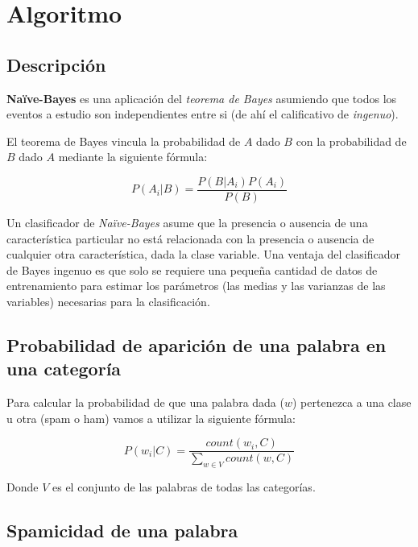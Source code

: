\section{Algoritmo}

\subsection{Descripción}

\textbf{Naïve-Bayes} es una aplicación del \textit{teorema de Bayes} asumiendo
que todos los eventos a estudio son independientes entre si (de ahí el
calificativo de \textit{ingenuo}).

El teorema de Bayes vincula la probabilidad de $A$ dado $B$ con la probabilidad
de $B$ dado $A$ mediante la siguiente fórmula:

\begin{equation}
	\label{eq:bayes}
	P(A_i | B) = \frac{P(B | A_i) P(A_i)}{P(B)}
\end{equation}

Un clasificador de \textit{Naïve-Bayes} asume que la presencia o ausencia de
una característica particular no está relacionada con la presencia o ausencia
de cualquier otra característica, dada la clase variable. Una ventaja del
clasificador de Bayes ingenuo es que solo se requiere una pequeña cantidad de
datos de entrenamiento para estimar los parámetros (las medias y las varianzas
de las variables) necesarias para la clasificación.

\subsection[Probabilidad de una palabra]{Probabilidad de aparición de una palabra en una categoría}

Para calcular la probabilidad de que una palabra dada ($w$) pertenezca a una
clase u otra (spam o ham) vamos a utilizar la siguiente fórmula:

\begin{equation}
	\label{eq:prob-palabra}
	P(w_i|C) = \frac{count(w_i, C)}{\displaystyle\sum_{w \in V}{count(w, C)}}
\end{equation}

Donde $V$ es el conjunto de las palabras de todas las categorías.

\subsection{Spamicidad de una palabra}

